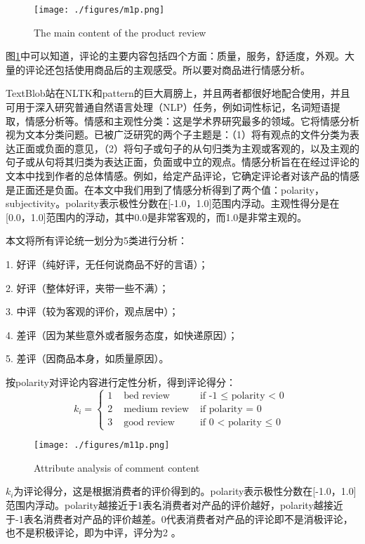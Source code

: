\documentclass[UTF8]{article}
\newcommand{\upcite}[1]{\textsuperscript{\textsuperscript{\cite{#1}}}}
\begin{document}
\begin{figure}[H]
	\centering
	\texttt{[image: ./figures/m1p.png]}
	\caption{The main content of the product review} \label{m1p}
\end{figure}

图\ref{m1p}中可以知道，评论的主要内容包括四个方面：质量，服务，舒适度，外观。大量的评论还包括使用商品后的主观感受。所以要对商品进行情感分析。

TextBlob站在NLTK和pattern的巨大肩膀上，并且两者都很好地配合使用，并且可用于深入研究普通自然语言处理（NLP）任务，例如词性标记，名词短语提取，情感分析等\upcite{Martinc2015Efficient}。情感和主观性分类：这是学术界研究最多的领域。它将情感分析视为文本分类问题。已被广泛研究的两个子主题是：（1）将有观点的文件分类为表达正面或负面的意见，（2）将句子或句子的从句归类为主观或客观的，以及主观的句子或从句将其归类为表达正面，负面或中立的观点。情感分析旨在在经过评论的文本中找到作者的总体情感。例如，给定产品评论，它确定评论者对该产品的情感是正面还是负面。在本文中我们用到了情感分析得到了两个值：polarity，subjectivity。polarity表示极性分数在[-1.0，1.0]范围内浮动。主观性得分是在[0.0，1.0]范围内的浮动，其中0.0是非常客观的，而1.0是非常主观的。

本文将所有评论统一划分为5类进行分析：

1.  好评（纯好评，无任何说商品不好的言语）；

2.  好评（整体好评，夹带一些不满）；

3.  中评（较为客观的评价，观点居中）；

4.  差评（因为某些意外或者服务态度，如快递原因）；

5.  差评（因商品本身，如质量原因）。

按polarity对评论内容进行定性分析，得到评论得分：
\begin{equation}\label{m1gs1}
k_i=\left\{\begin{array}{lll}
1 & \text { bed review } & \text {if -1 $\leq$ polarity < 0 }\\
2 & \text { medium review } & \text {if polarity = 0 }\\
3 & \text { good review } & \text {if 0 < polarity $\leq$ 0 }
\end{array}\right.
\end{equation}
\begin{figure}[!htbp]
	\centering
	\texttt{[image: ./figures/m11p.png]}
	\caption{Attribute analysis of comment content} \label{m11p}
\end{figure}

$k_i$为评论得分，这是根据消费者的评价得到的。polarity表示极性分数在[-1.0，1.0]范围内浮动。polarity越接近于1表名消费者对产品的评价越好，polarity越接近于-1表名消费者对产品的评价越差。0代表消费者对产品的评论即不是消极评论，也不是积极评论，即为中评，评分为2 。
\end{document}

